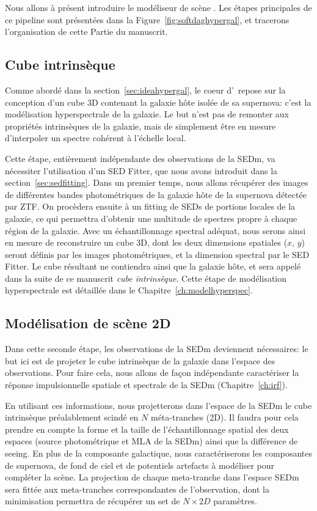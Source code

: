 \documentclass[../main/main.tex]{subfiles}
\begin{document}
Nous allons à présent introduire le modéliseur de scène \hypergal.
Les étapes principales de ce pipeline sont présentées dans la
Figure~\ref{fig:softdaghypergal}, et tracerons l'organisation de cette
Partie du manuscrit.

\subsection{Cube intrinsèque}

Comme abordé dans la section~\ref{sec:ideahypergal}, le coeur
d'\hypergal\ repose sur la conception d'un cube 3D contenant la galaxie
hôte isolée de sa supernova: c'est la modélisation hyperspectrale de la galaxie. Le but n'est pas de remonter aux propriétés
intrinsèques de la galaxie, mais de simplement être en mesure
d'interpoler un spectre cohérent à l'échelle local.

Cette étape, entièrement indépendante des observations de la
SEDm, va nécessiter l'utilisation d'un SED Fitter, que nous avons
introduit dans la section~\ref{sec:sedfitting}. Dans un premier temps,
nous allons 
récupérer des images de différentes bandes photométriques de la galaxie hôte de la supernova
détectée par ZTF. On procèdera ensuite à un fitting de SEDs de portions
locales de la galaxie, ce qui permettra d'obtenir une multitude de
spectres propre à chaque région de la galaxie. Avec un échantillonnage spectral
adéquat, nous serons ainsi en mesure de reconstruire un cube 3D, dont
les deux dimensions spatiales ($x$, $y$) seront définis par les images
photométriques, et la dimension spectral par le SED Fitter. Le cube
résultant ne contiendra ainsi que la galaxie hôte, et sera appelé dans
la suite de ce manuscrit \textit{cube intrinsèque}. Cette étape de
modélisation hyperspectrale est détaillée dans le Chapitre~\ref{ch:modelhyperspec}.

\subsection{Modélisation de scène 2D}

Dans cette seconde étape, les observations de la SEDm deviennent
nécessaires: le but ici est de projeter le cube intrinsèque de la
galaxie dans l'espace des observations. Pour faire cela, nous allons de
façon indépendante caractériser la réponse impulsionnelle spatiale et
spectrale de la SEDm (Chapitre~\ref{ch:irf}).

En utilisant ces informations, nous projetterons dans l'espace de la
SEDm le cube intrinsèque préalablement scindé en $N$ méta-tranches
(2D). Il faudra pour cela prendre en compte la forme et la taille de l'échantillonnage
spatial des deux espaces (source photométrique et MLA de la SEDm) ainsi que la différence de seeing.
En plus de la composante galactique, nous caractériserons les composantes
de supernova, de fond de ciel et de potentiels artefacts à modéliser
pour compléter la scène.
La projection de chaque meta-tranche dans l'espace SEDm sera fittée aux
meta-tranches correspondantes de l'observation, dont la minimisation permettra de récupérer un set de
$N\times2D$ paramètres.
\end{document}
